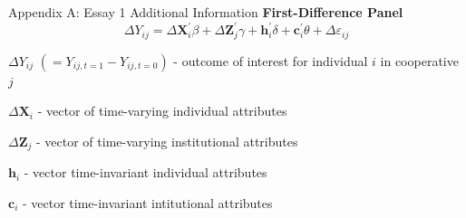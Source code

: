 \documentclass[aspectratio=169]{beamer}
\newenvironment{wideitemize}{\itemize\addtolength{\itemsep}{10pt}}{\enditemize}
\begin{document}
\begin{frame}{Appendix A: Essay 1 Additional Information}
\textbf{First-Difference Panel} \vspace{.5cm}
            \begin{equation} \label{eq:E1_7}
                \Delta Y_{ij} = \Delta \mathbf{X}_i^{\prime}\beta + \Delta \mathbf{Z}_j^{\prime}\gamma + \mathbf{h}_i^{\prime}\delta + \mathbf{c}_i^{\prime}\theta + \Delta \varepsilon_{ij}
            \end{equation}  
    \begin{wideitemize}    
        \item $\Delta Y_{ij}$ $(= Y_{ij,t=1} - Y_{ij,t=0})$ - outcome of interest for individual $i$ in cooperative $j$
        \item $\Delta \mathbf{X}_i$ - vector of time-varying individual attributes
        \item $\Delta \mathbf{Z}_j$ - vector of time-varying institutional attributes
        \item $\mathbf{h}_i$ - vector time-invariant individual attributes
        \item $\mathbf{c}_i$ - vector time-invariant intitutional attributes
    \end{wideitemize}    
\end{frame}
\end{document}
